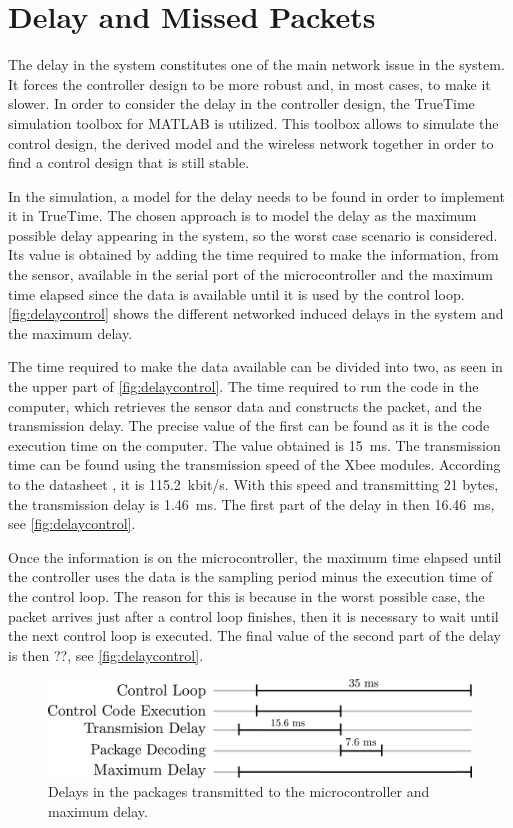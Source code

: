 \section{Delay and Missed Packets}
The delay in the system constitutes one of the main network issue in the system. It forces the controller design to be more robust and, in most cases, to make it slower. In order to consider the delay in the controller design, the TrueTime simulation toolbox for MATLAB is utilized. This toolbox allows to simulate the control design, the derived model and the wireless network together in order to find a control design that is still stable.

In the simulation, a model for the delay needs to be found in order to implement it in TrueTime. The chosen approach is to model the delay as the maximum possible delay appearing in the system, so the worst case scenario is considered. Its value is obtained by adding the time required to make the information, from the sensor, available in the serial port of the microcontroller and the maximum time elapsed since the data is available until it is used by the control loop. \autoref{fig:delaycontrol} shows the different networked induced delays in the system and the maximum delay.  

The time required to make the data available can be divided into two, as seen in the upper part of \autoref{fig:delaycontrol}. The time required to run the code in the computer, which retrieves the sensor data and constructs the packet, and the transmission delay. The precise value of the first can be found as it is the code execution time on the computer. The value obtained is \SI{15}{ms}. The transmission time can be found using the transmission speed of the Xbee modules. According to the datasheet \cite{XBee}, it is \SI{115.2}{kbit/s}. With this speed and transmitting 21 bytes, the transmission delay is \SI{1.46}{ms}. The first part of the delay in then \SI{16.46}{ms}, see \autoref{fig:delaycontrol}.

Once the information is on the microcontroller, the maximum time elapsed until the controller uses the data is the sampling period minus the execution time of the control loop. The reason for this is because in the worst possible case, the packet arrives just after a control loop finishes, then it is necessary to wait until the next control loop is executed. The final value of the second part of the delay is then ??, see \autoref{fig:delaycontrol}.
 
\begin{figure}[H]
	\centering
	\includegraphics[width=.6\textwidth]{figures/maxDelay.pdf}
	\caption{Delays in the packages transmitted to the microcontroller and maximum delay.}
	\label{fig:delaycontrol}
\end{figure}

